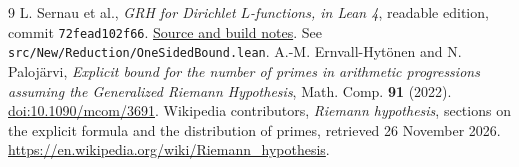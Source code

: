 \documentclass[11pt]{article}
\begin{document}
\begin{thebibliography}{9}\small
{} L. Sernau et al., \emph{GRH for Dirichlet $L$-functions, in Lean 4}, readable edition, commit \texttt{72fead102f66}. \href{https://github.com/lsernau/grh-lean/tree/72fead102f663d5c7a407964a13dc0cf9d977207/grh}{Source and build notes}. See \texttt{src/New/Reduction/OneSidedBound.lean}.
 A.-M. Ernvall-Hyt\"onen and N. Paloj\"arvi, \emph{Explicit bound for the number of primes in arithmetic progressions assuming the Generalized Riemann Hypothesis}, Math. Comp. \textbf{91} (2022). \href{https://doi.org/10.1090/mcom/3691}{doi:10.1090/mcom/3691}.
 Wikipedia contributors, \emph{Riemann hypothesis}, sections on the explicit formula and the distribution of primes, retrieved 26 November 2026. \url{https://en.wikipedia.org/wiki/Riemann_hypothesis}.
\end{thebibliography}
\end{document}
